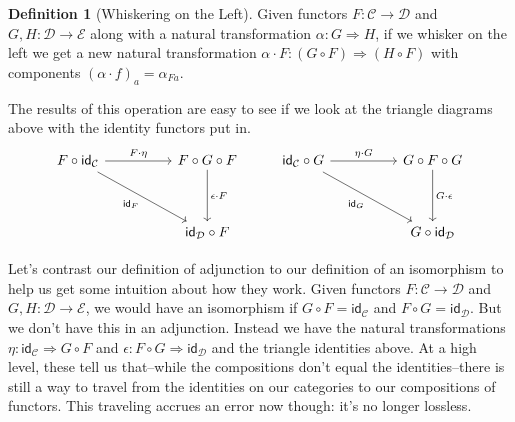 \documentclass[12pt]{article}
\theoremstyle{definition}
\newtheorem{definition}{Definition}
\begin{document}
\begin{definition}[Whiskering on the Left]
    Given functors $F: \mathcal{C} \rightarrow \mathcal{D}$ and $G,H:\mathcal{D} \rightarrow \mathcal{E}$ along with a natural transformation $\alpha:G \Rightarrow H$, if we whisker on the left we get a new natural transformation $\alpha\cdot F : (G \circ F) \Rightarrow (H \circ F)$ with components $(\alpha\cdot f)_a=\alpha_{Fa}$.
\end{definition}
The results of this operation are easy to see if we look at the triangle diagrams above with the identity functors put in.
\[\begin{tikzcd}
        {F\circ \mathsf{id}_\mathcal{C}} && {F \circ G \circ F} & {\mathsf{id}_\mathcal{C} \circ G} && {G \circ F \circ G} \\
        \\
        && {\mathsf{id}_\mathcal{D} \circ F} &&& {G \circ \mathsf{id}_\mathcal{D}}
        \arrow["{F \cdot \eta}", from=1-1, to=1-3]
        \arrow["{\epsilon \cdot F}", from=1-3, to=3-3]
        \arrow["{\mathsf{id}_F}"', from=1-1, to=3-3]
        \arrow["{\eta \cdot G}", from=1-4, to=1-6]
        \arrow["{G \cdot \epsilon}", from=1-6, to=3-6]
        \arrow["{\mathsf{id}_G}"', from=1-4, to=3-6]
    \end{tikzcd}\]

Let's contrast our definition of adjunction to our definition of an isomorphism to help us get some intuition about how they work.
Given functors $F: \mathcal{C} \rightarrow \mathcal{D}$ and $G,H:\mathcal{D} \rightarrow \mathcal{E}$, we would have an isomorphism if $G \circ F = \mathsf{id}_\mathcal{C}$ and $F \circ G = \mathsf{id}_\mathcal{D}$.
But we don't have this in an adjunction.
Instead we have the natural transformations $\eta : \mathsf{id}_\mathcal{C} \Rightarrow G \circ F$ and $\epsilon: F \circ G \Rightarrow \mathsf{id}_\mathcal{D}$ and the triangle identities above.
At a high level, these tell us that--while the compositions don't equal the identities--there is still a way to travel from the identities on our categories to our compositions of functors.
This traveling accrues an error now though: it's no longer lossless.

\end{document}
